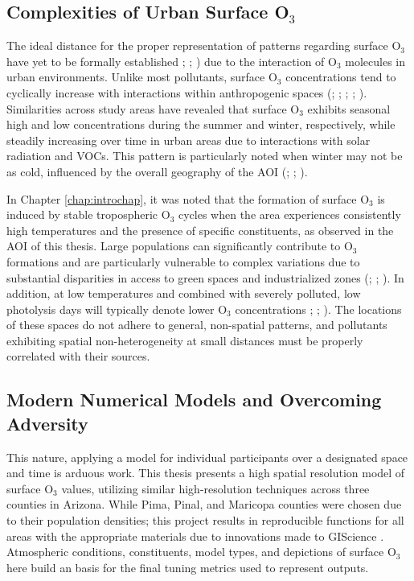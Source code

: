 \subsection{Complexities of Urban Surface O$_3$} \label{subs:sofat1} The ideal distance for the proper representation of patterns regarding surface O$_3$ have yet to be formally established \cite{abdullah_development_2019}; \cite{tong_characteristics_2017}; \cite{wang_does_2023}) due to the interaction of O$_3$ molecules in urban environments. Unlike most pollutants, surface O$_3$ concentrations tend to cyclically increase with interactions within anthropogenic spaces (\cite{choi_summertime_2012}; \cite{damico_cyclic_2024}; \cite{guan_summer_2023}; \cite{kim_modeling_2016}; \cite{oltmans_seasonal_1992}). Similarities across study areas have revealed that surface O$_3$ exhibits seasonal high and low concentrations during the summer and winter, respectively, while steadily increasing over time in urban areas due to interactions with solar radiation and VOCs. This pattern is particularly noted when winter may not be as cold, influenced by the overall geography of the AOI (\cite{alves_first_2024}; \cite{guan_summer_2023}; \cite{perera_nox-voc-o3_2019}). 

In Chapter \ref{chap:introchap}, it was noted that the formation of surface O$_3$ is induced by stable tropospheric O$_3$ cycles when the area experiences consistently high temperatures and the presence of specific constituents, as observed in the AOI of this thesis. Large populations can significantly contribute to O$_3$ formations and are particularly vulnerable to complex variations due to substantial disparities in access to green spaces and industrialized zones (\cite{pan_vertical_2024}; \cite{cai_oxidative_2022}; \cite{meo_effect_2021}). In addition, at low temperatures and combined with severely polluted, low photolysis days will typically denote lower O$_3$ concentrations \cite{he_sensitivity_1999}; \cite{jimenez_ozone_2004}; \cite{manzini_detection_2024}). The locations of these spaces do not adhere to general, non-spatial patterns, and pollutants exhibiting spatial non-heterogeneity at small distances must be properly correlated with their sources. 
\subsection{Modern Numerical Models and Overcoming Adversity} \label{subs:sofat2} This nature, applying a model for individual participants over a designated space and time is arduous work. This thesis presents a high spatial resolution model of surface O$_3$ values, utilizing similar high-resolution techniques across three counties in Arizona. While Pima, Pinal, and Maricopa counties were chosen due to their population densities; this project results in reproducible functions for all areas with the appropriate materials due to innovations made to GIScience \cite{goodchild_mapping_2018}. Atmospheric conditions, constituents, model types, and depictions of surface O$_3$ here build an basis for the final tuning metrics used to represent outputs.

